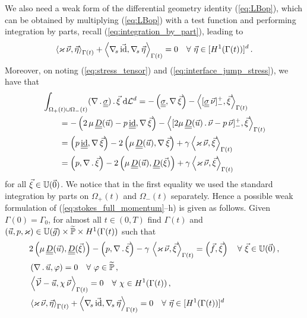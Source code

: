 We also need a weak form of the differential geometry identity
(\ref{eq:LBop}), which can be obtained by multiplying (\ref{eq:LBop}) with a
test function and performing integration by parts,
recall (\ref{eq:integration_by_part}), leading to
\begin{equation}\label{eq:weak_nabs_id}
\left\langle \varkappa\,\vec\nu, \vec\eta \right\rangle_{\Gamma(t)}
+ \left\langle \nabla_{\!s}\,\vec {\rm id}, \nabla_{\!s}\,\vec \eta \right\rangle_{\Gamma(t)}
= 0  \quad \forall\ \vec\eta \in [H^1(\Gamma(t))]^d\,.
\end{equation}
Moreover, on noting (\ref{eq:stress_tensor}) and
(\ref{eq:interface_jump_stress}), we have that
\begin{align}\label{eq:weak_stress_jump}
& \int_{\Omega_+(t)\cup\Omega_-(t)} (\nabla\,.\,\mat\sigma)\,.\, \vec \xi \dL{d}
= - \left(\mat\sigma, \nabla\,\vec \xi\right)
- \left\langle [\mat\sigma\,\vec\nu]_-^+ , \vec \xi \right\rangle_{\Gamma(t)}
\nonumber \\
& \qquad = - \left(2\,\mu\, \mat D(\vec u)-p\,\mat\id, \nabla\,\vec \xi\right)
- \left\langle [2\mu \,\mat D(\vec u)\,.\,\vec\nu - p\,\vec \nu]_-^+ , \vec \xi
\right\rangle_{\Gamma(t)} \nonumber \\
& \qquad = \left(p\,\mat\id, \nabla\,\vec \xi\right) -2 \left(\mu\,
\mat D(\vec u), \nabla\,\vec \xi\right) + \gamma \left\langle \varkappa\,
\vec \nu , \vec \xi  \right\rangle_{\Gamma(t)} \nonumber \\
& \qquad = \left( p , \nabla\,.\,\vec \xi\right)
-2 \left(\mu\,\mat D(\vec u) , \mat D(\vec \xi) \right)
+ \gamma \left\langle \varkappa\,\vec \nu , \vec \xi  \right\rangle_{\Gamma(t)}
\end{align}
for all $\vec \xi \in \mathbb{U}(\vec{0})$. We notice that in the first equality we used
the standard integration by parts on $\Omega_+(t)$ and $\Omega_-(t)$
separately. Hence a possible weak formulation of
(\ref{eq:stokes_full_momentum}--h) is given as follows.
\sloppy Given $\Gamma(0) = \Gamma_0$, for almost all $t\in(0,T)$ find
$\Gamma(t)$ and ${(\vec u, p, \varkappa) \in \mathbb{U}(\vec{g}) \times \widetilde{\mathbb{P}}
\times H^1(\Gamma(t))}$ such that
\begin{subequations}
\begin{align}
& 2\left(\mu\,\mat D(\vec u), \mat D(\vec \xi)\right)
- \left(p, \nabla\,.\,\vec \xi\right)
- \gamma\,\left\langle \varkappa\,\vec\nu, \vec\xi\right\rangle_{\Gamma(t)}
= \left(\vec f, \vec \xi\right)\quad \forall\ \vec\xi \in \uspace 0 \,,
\label{eq:stokes_weaka}\\
& \left(\nabla\,.\,\vec u, \varphi\right) = 0
\quad \forall\ \varphi \in \pnormspace\,, \label{eq:stokes_weakb} \\
&  \left\langle \V
- \vec u, \chi\,\vec\nu \right\rangle_{\Gamma(t)} = 0
\quad \forall\ \chi \in H^1(\Gamma(t))\,, \label{eq:stokes_weakc} \\
& \left\langle \varkappa\,\vec\nu, \vec\eta \right\rangle_{\Gamma(t)}
+ \left\langle \nabs\,\vec \id, \nabs\,\vec \eta \right\rangle_{\Gamma(t)}
= 0  \quad \forall\ \vec\eta \in [H^1(\Gamma(t))]^d\,\label{eq:stokes_weakd}
\end{align}
\end{subequations}
